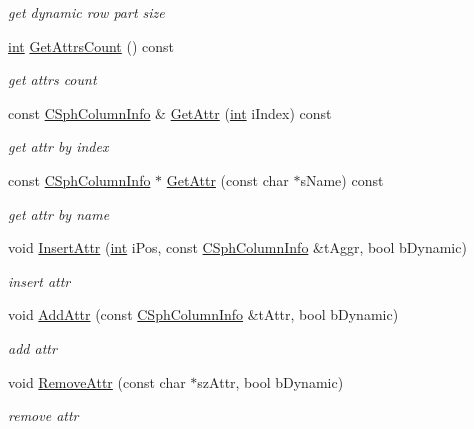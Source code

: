 \begin{DoxyCompactItemize}
\begin{DoxyCompactList}\small\item\em get dynamic row part size \end{DoxyCompactList}\item 
\hyperlink{sphinxexpr_8cpp_a4a26e8f9cb8b736e0c4cbf4d16de985e}{int} \hyperlink{classCSphSchema_a161cef3327616087c9df7c8f4f2ddd4a}{Get\-Attrs\-Count} () const 
\begin{DoxyCompactList}\small\item\em get attrs count \end{DoxyCompactList}\item 
const \hyperlink{structCSphColumnInfo}{C\-Sph\-Column\-Info} \& \hyperlink{classCSphSchema_a5ded2f2dbca6600b6643b2ffa764eda2}{Get\-Attr} (\hyperlink{sphinxexpr_8cpp_a4a26e8f9cb8b736e0c4cbf4d16de985e}{int} i\-Index) const 
\begin{DoxyCompactList}\small\item\em get attr by index \end{DoxyCompactList}\item 
const \hyperlink{structCSphColumnInfo}{C\-Sph\-Column\-Info} $\ast$ \hyperlink{classCSphSchema_a21edfa34e461bebbea5a2317fa105015}{Get\-Attr} (const char $\ast$s\-Name) const 
\begin{DoxyCompactList}\small\item\em get attr by name \end{DoxyCompactList}\item 
void \hyperlink{classCSphSchema_aec6e5c88cea5b751a9c8afd8be0a8649}{Insert\-Attr} (\hyperlink{sphinxexpr_8cpp_a4a26e8f9cb8b736e0c4cbf4d16de985e}{int} i\-Pos, const \hyperlink{structCSphColumnInfo}{C\-Sph\-Column\-Info} \&t\-Aggr, bool b\-Dynamic)
\begin{DoxyCompactList}\small\item\em insert attr \end{DoxyCompactList}\item 
void \hyperlink{classCSphSchema_aedd18131dbf9c3e2b326052b8a656ee6}{Add\-Attr} (const \hyperlink{structCSphColumnInfo}{C\-Sph\-Column\-Info} \&t\-Attr, bool b\-Dynamic)
\begin{DoxyCompactList}\small\item\em add attr \end{DoxyCompactList}\item 
void \hyperlink{classCSphSchema_af47fcbfbf3a7b074e9c1b9375463b021}{Remove\-Attr} (const char $\ast$sz\-Attr, bool b\-Dynamic)
\begin{DoxyCompactList}\small\item\em remove attr \end{DoxyCompactList}\item 

\end{DoxyCompactItemize}
